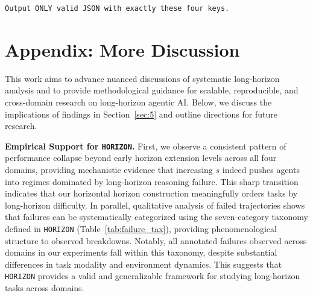 \documentclass[11pt]{article}
\begin{document}
\begin{tcolorbox}[
  breakable,
  colback=gray!8,
  colframe=gray!55,
  title=\textbf{Judge System Prompt (combined Stage~1 + Stage~2)},
  fonttitle=\bfseries\small,
  left=4pt,right=4pt,top=3pt,bottom=3pt,
]
\begin{verbatim}
Output ONLY valid JSON with exactly these four keys.
\end{verbatim}
\end{tcolorbox}

\twocolumn
\section{Appendix: More Discussion}


This work aims to advance nuanced discussions of systematic long-horizon analysis and to provide methodological guidance for scalable, reproducible, and cross-domain research on long-horizon agentic AI. 
Below, we discuss the implications of findings in Section~\ref{sec:5} and outline directions for future research. 

\textbf{Empirical Support for \texttt{HORIZON}.}
First, we observe a consistent pattern of performance collapse beyond early horizon extension levels across all four domains, providing mechanistic evidence that increasing $s$ indeed pushes agents into regimes dominated by long-horizon reasoning failure. This sharp transition indicates that our horizontal horizon construction meaningfully orders tasks by long-horizon difficulty. 
In parallel, qualitative analysis of failed trajectories shows that failures can be systematically categorized using the seven-category taxonomy defined in \texttt{HORIZON} (Table~\ref{tab:failure_tax}), providing phenomenological structure to observed breakdowns. Notably, all annotated failures observed across domains in our experiments fall within this taxonomy, despite substantial differences in task modality and environment dynamics. This suggests that \texttt{HORIZON} provides a valid and generalizable framework for studying long-horizon tasks across domains.
\end{document}
